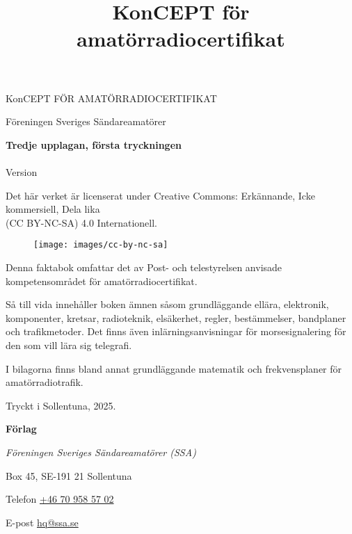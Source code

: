 \onecolumn{}
\vspace{10em}
\title{KonCEPT för amatörradiocertifikat}
\begin{center}
\Large{KonCEPT FÖR AMATÖRRADIOCERTIFIKAT}

Föreningen Sveriges Sändareamatörer\\[2\baselineskip]
\end{center}

\noindent \textbf{Tredje upplagan, första tryckningen}\\
\noindent \ISBN \\
\noindent Version \revision
\bigskip

\noindent Det här verket är licenserat under Creative Commons:\newline
\noindent Erkännande, Icke kommersiell, Dela lika\\
\noindent (CC BY-NC-SA) 4.0 Internationell.
\begin{figure}[h]
    \texttt{[image: images/cc-by-nc-sa]}
\end{figure}

\vfill

\noindent Denna faktabok omfattar det av Post- och tele\-styrel\-sen anvisade
kompetensområdet för amatörradiocertifikat.

\bigskip

\noindent Så till vida innehåller boken ämnen såsom grundläggande ellära, elektronik, komponenter,
kretsar, radioteknik, elsäkerhet, regler, bestämmelser, bandplaner och tra\-fik\-metoder.
Det finns även inlärningsanvisningar för morsesignalering för den
som vill lära sig telegrafi.

\bigskip

\noindent I bilagorna finns bland annat grundläggande matematik
och frekvensplaner för ama\-törradiotrafik.

\vfill

\noindent Tryckt i Sollentuna, 2025.

\bigskip

\noindent \textbf{Förlag}

\smallskip

\noindent\textit{Föreningen Sveriges Sändareamatörer (SSA)}

\smallskip\noindent Box 45, SE-191 21 Sollentuna

\smallskip\noindent Telefon \href{tel:+46709585702}{+46 70 958 57 02}

\smallskip\noindent E-post \href{mailto:hq@ssa.se}{hq@ssa.se}

\restoregeometry\twocolumn
{}
